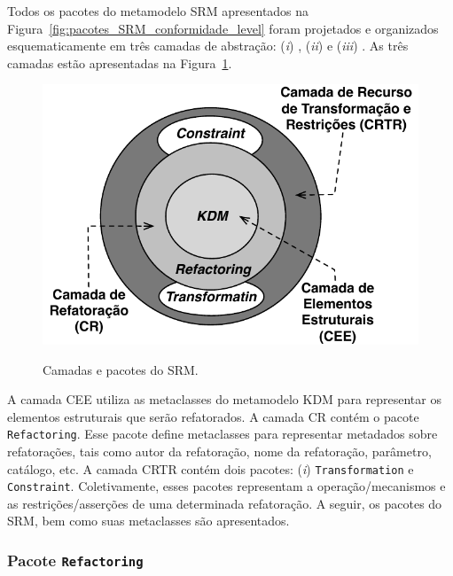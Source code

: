 Todos os pacotes do metamodelo SRM apresentados na Figura~\ref{fig:pacotes_SRM_conformidade_level} foram projetados e organizados esquematicamente em três camadas de abstração: (\textit{i}) , (\textit{ii})  e (\textit{iii}) . As três camadas estão apresentadas na Figura~\ref{fig:camadas_e_pacotes_do_srm}.

\begin{figure}[h]
	\centering
		\caption{Camadas e pacotes do SRM.}
	\includegraphics[scale=0.77]{images/LayerSRM}
	\label{fig:camadas_e_pacotes_do_srm}
	\fautor
\end{figure}

A camada CEE utiliza as metaclasses do metamodelo KDM para representar os elementos estruturais que serão refatorados. A camada CR contém o pacote \texttt{Refactoring}. Esse pacote define metaclasses para representar metadados sobre refatorações, tais como autor da refatoração, nome da refatoração, parâmetro, catálogo, etc. A camada CRTR contém dois pacotes: (\textit{i})  \texttt{Transformation} e \texttt{Constraint}. Coletivamente, esses pacotes representam a operação/mecanismos e as restrições/asserções de uma determinada refatoração. A seguir, os pacotes do SRM, bem como suas metaclasses são apresentados.

\subsubsection{Pacote \texttt{Refactoring}}

